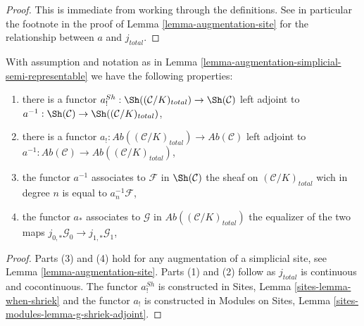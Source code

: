 \begin{proof}
This is immediate from working through the definitions.
See in particular the footnote in the proof of
Lemma \ref{lemma-augmentation-site}
for the relationship between $a$ and $j_{total}$.
\end{proof}

\begin{lemma}
\label{lemma-comparison}
With assumption and notation as in
Lemma \ref{lemma-augmentation-simplicial-semi-representable}
we have the following properties:
\begin{enumerate}
\item there is a functor
$a^{Sh}_! : \Sh((\mathcal{C}/K)_{total}) \to \Sh(\mathcal{C})$
left adjoint to $a^{-1} : \Sh(\mathcal{C}) \to \Sh((\mathcal{C}/K)_{total})$,
\item there is a functor
$a_! : \textit{Ab}((\mathcal{C}/K)_{total}) \to \textit{Ab}(\mathcal{C})$
left adjoint to
$a^{-1} : \textit{Ab}(\mathcal{C}) \to \textit{Ab}((\mathcal{C}/K)_{total})$,
\item the functor $a^{-1}$ associates to
$\mathcal{F}$ in $\Sh(\mathcal{C})$ the sheaf on $(\mathcal{C}/K)_{total}$
wich in degree $n$ is equal to $a_n^{-1}\mathcal{F}$,
\item the functor $a_*$ associates to $\mathcal{G}$ in
$\textit{Ab}((\mathcal{C}/K)_{total})$ the equalizer of the two maps
$j_{0, *}\mathcal{G}_0 \to j_{1, *}\mathcal{G}_1$,
\end{enumerate}
\end{lemma}

\begin{proof}
Parts (3) and (4) hold for any augmentation of a
simplicial site, see Lemma \ref{lemma-augmentation-site}.
Parts (1) and (2) follow as $j_{total}$ is continuous and cocontinuous.
The functor $a^{Sh}_!$ is constructed in
Sites, Lemma \ref{sites-lemma-when-shriek}
and the functor $a_!$ is constructed in
Modules on Sites, Lemma
\ref{sites-modules-lemma-g-shriek-adjoint}.
\end{proof}


